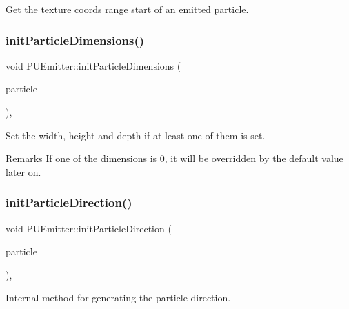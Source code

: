 Get the texture coords range start of an emitted particle. \mbox{\label{classPUEmitter_ad3affd063a8152664e3eb8902812c1ba}} 
\subsubsection{\texorpdfstring{init\+Particle\+Dimensions()}{initParticleDimensions()}}
{\footnotesize\ttfamily void P\+U\+Emitter\+::init\+Particle\+Dimensions (\begin{DoxyParamCaption}\item[{\hyperlink{structPUParticle3D}{P\+U\+Particle3D} $\ast$}]{particle }\end{DoxyParamCaption})\hspace{0.3cm}{\ttfamily [protected]}, {\ttfamily [virtual]}}

Set the width, height and depth if at least one of them is set. \begin{DoxyRemark}{Remarks}
If one of the dimensions is 0, it will be overridden by the default value later on.
\end{DoxyRemark}
\mbox{\label{classPUEmitter_a0dffa0a17008ddaaec73c6042ea1a019}} 
\subsubsection{\texorpdfstring{init\+Particle\+Direction()}{initParticleDirection()}\hspace{0.1cm}{\footnotesize\ttfamily [1/2]}}
{\footnotesize\ttfamily void P\+U\+Emitter\+::init\+Particle\+Direction (\begin{DoxyParamCaption}\item[{\hyperlink{structPUParticle3D}{P\+U\+Particle3D} $\ast$}]{particle }\end{DoxyParamCaption})\hspace{0.3cm}{\ttfamily [protected]}, {\ttfamily [virtual]}}

Internal method for generating the particle direction. 


